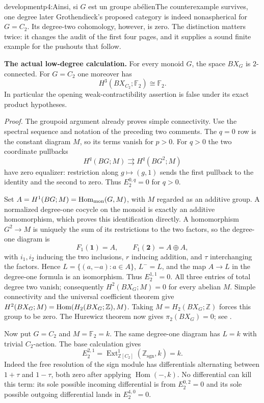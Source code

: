 \begin{dcomment}{development}{p4:Ainsi, si $G$ est un groupe abélien}{The counterexample survives, one degree later}
Grothendieck's proposed category is indeed nonaspherical for $G=C_2$. Its degree-two cohomology, however, is zero. The distinction matters twice: it changes the audit of the first four pages, and it supplies a sound finite example for the pushouts that follow.

\textbf{The actual low-degree calculation.}\ours
For every monoid $G$, the space $BX_G$ is $2$-connected. For $G=C_2$ one moreover has
\[
 H^3(BX_{C_2};\mathbb F_2)\cong\mathbb F_2.
\]
In particular the opening weak-contractibility assertion is false under its exact product hypotheses.

\emph{Proof.} The groupoid argument already proves simple connectivity. Use the spectral sequence and notation of the preceding two comments. The $q=0$ row is the constant diagram $M$, so its terms vanish for $p>0$. For $q>0$ the two coordinate pullbacks
\[
 H^q(BG;M)\rightrightarrows H^q(BG^2;M)
\]
have zero equalizer: restriction along $g\mapsto(g,1)$ sends the first pullback to the identity and the second to zero. Thus $E_2^{0,q}=0$ for $q>0$.

Set $A=H^1(BG;M)=\mathrm{Hom}_{\mathrm{mon}}(G,M)$, with $M$ regarded as an additive group. A normalized degree-one cocycle on the monoid is exactly an additive homomorphism, which proves this identification directly. A homomorphism $G^2\to M$ is uniquely the sum of its restrictions to the two factors, so the degree-one diagram is
\[
 F_1(\mathbf1)=A,\qquad F_1(\mathbf2)=A\oplus A,
\]
with $i_1,i_2$ inducing the two inclusions, $r$ inducing addition, and $\tau$ interchanging the factors. Hence $L=\{(a,-a):a\in A\}$, $L^-=L$, and the map $A\to L$ in the degree-one formula is an isomorphism. Thus $E_2^{1,1}=0$. All three entries of total degree two vanish; consequently $H^2(BX_G;M)=0$ for every abelian $M$. Simple connectivity and the universal coefficient theorem give $H^2(BX_G;M)=\mathrm{Hom}(H_2(BX_G;\mathbb Z),M)$. Taking $M=H_2(BX_G;\mathbb Z)$ forces this group to be zero. The Hurewicz theorem now gives $\pi_2(BX_G)=0$; see \citet[Theorems 3.2 and 4.32]{Hatcher2002}.

Now put $G=C_2$ and $M=\mathbb F_2=k$. The same degree-one diagram has $L=k$ with trivial $C_2$-action. The base calculation gives
\[
 E_2^{2,1}=\operatorname{Ext}^1_{\mathbb Z[C_2]}(\mathbb Z_{\mathrm{sgn}},k)=k.
\]
Indeed the free resolution of the sign module has differentials alternating between $1+\tau$ and $1-\tau$, both zero after applying $\operatorname{Hom}(-,k)$. No differential can kill this term: its sole possible incoming differential is from $E_2^{0,2}=0$ and its sole possible outgoing differential lands in $E_2^{4,0}=0$.


\end{dcomment}
